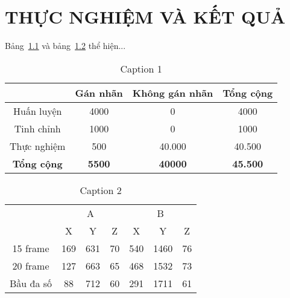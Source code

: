 \chapter{THỰC NGHIỆM VÀ KẾT QUẢ}

Bảng~\ref{table:manually_category_2} và bảng~\ref{table:Result_1} thể hiện...

\begin{table}[htpt]
\begin{center}
\begin{tabular}{|c|c|c|c|}
\hline
 & Gán nhãn & Không gán nhãn  & \textbf{Tổng cộng}\\
\hline
Huấn luyện & 4000 & 0 & 4000\\
\hline
Tinh chỉnh & 1000 & 0 & 1000\\
\hline
Thực nghiệm & 500 & 40.000 & 40.500\\
\hline
\textbf{Tổng cộng} & \textbf{5500} & \textbf{40000} &  \textbf{45.500}\\
\hline
\end{tabular}
\caption{Caption 1}
\label{table:manually_category_2}
\end{center}
\end{table}

\begin{table}[htpt]
\begin{center}
\begin{tabular}{|c|c|c|c|c|c|c|}
\hline
\multirow{2}{*}{} & \multicolumn{3}{c|}{A} & \multicolumn{3}{c|}{B}\\
\cline{2-7}
& X & Y & Z & X & Y & Z \\
\hline
15 frame & 169 & 631 & 70 & 540 & 1460 & 76 \\
\hline
20 frame & 127 & 663 & 65 & 468 & 1532 & 73 \\
\hline
Bầu đa số & 88 & 712 & 60 & 291 & 1711 & 61 \\
\hline
\end{tabular}
\caption{Caption 2}
\label{table:Result_1}
\end{center}
\end{table}
\newpage